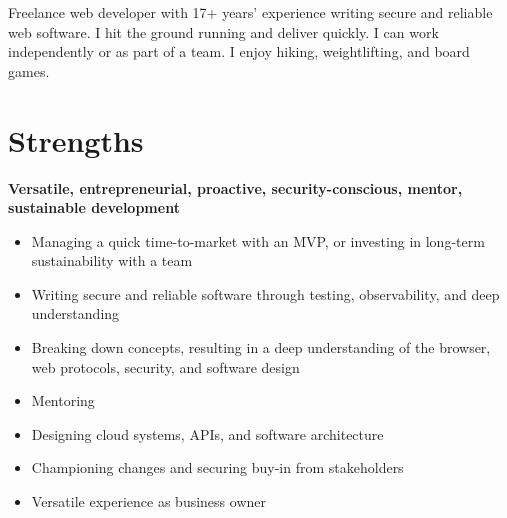 \documentclass[a4paper,10pt]{article}
\begin{document}

    Freelance web developer with 17+ years' experience writing secure and reliable web software.
    I hit the ground running and deliver quickly. I can work independently or as part of a team.
    I enjoy hiking, weightlifting, and board games.


          \section{Strengths}

          \textbf{Versatile, entrepreneurial, proactive, security-conscious, mentor, sustainable development}

            \begin{itemize}[itemsep=-2px, parsep=1pt, leftmargin=10pt]
              \item Managing a quick time-to-market with an MVP, or investing in long-term sustainability with a team
              \item Writing secure and reliable software through testing, observability, and deep understanding
              \item Breaking down concepts, resulting in a deep understanding of the browser, web protocols, security, and software design
              \item Mentoring
              \item Designing cloud systems, APIs, and software architecture
              \item Championing changes and securing buy-in from stakeholders
              \item Versatile experience as business owner
            \end{itemize}
\end{document}
